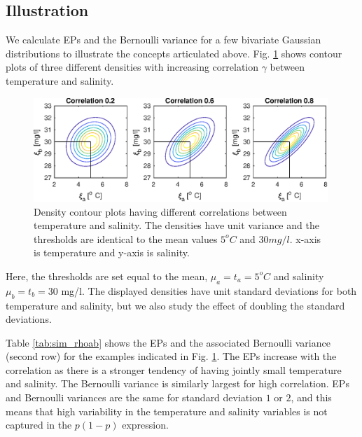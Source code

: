 \documentclass[aoas]{imsart}
\begin{document}
\subsection{Illustration}

We calculate EPs and the Bernoulli variance for a few bivariate
Gaussian distributions to illustrate the concepts articulated above.
Fig. \ref{illus_bivarDens} shows contour plots of three different
densities with increasing correlation $\gamma$ between temperature and
salinity.
\begin{figure}[h!] \centering
  \includegraphics[width=0.99\textwidth]{Figures/illus_bivar.eps}
  \caption{Density contour plots having different correlations between
    temperature and salinity. The densities have unit variance and the
    thresholds are identical to the mean values $5^o C$ and
    $30 mg/l$. x-axis is temperature and y-axis is salinity.}
\label{illus_bivarDens}
\end{figure}
Here, the thresholds are set equal to the mean, $\mu_a=t_a=5^o C$ and
salinity $\mu_b=t_b=30$ mg/l. The displayed densities have unit
standard deviations for both temperature and salinity, but we also
study the effect of doubling the standard deviations.

Table \ref{tab:sim_rhoab} shows the EPs and the associated Bernoulli
variance (second row) for the examples indicated in
Fig. \ref{illus_bivarDens}. The EPs increase with the correlation as
there is a stronger tendency of having jointly small temperature and
salinity. The Bernoulli variance is similarly largest for high
correlation. EPs and Bernoulli variances are the same for standard
deviation $1$ or $2$, and this means that high variability in the
temperature and salinity variables is not captured in the $p(1-p)$
expression.
\end{document}
